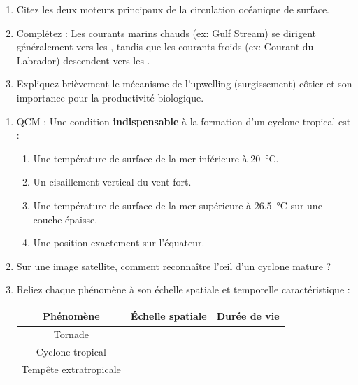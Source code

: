 \documentclass[11pt]{article}
\begin{document}
\begin{exercice}
\begin{enumerate}
    \item Citez les deux moteurs principaux de la circulation océanique de surface.
    \item Complétez : Les courants marins chauds (ex: Gulf Stream) se dirigent généralement vers les \underline{\hspace{3cm}}, tandis que les courants froids (ex: Courant du Labrador) descendent vers les \underline{\hspace{3cm}}.
    \item Expliquez brièvement le mécanisme de l'upwelling (surgissement) côtier et son importance pour la productivité biologique.
\end{enumerate}
\end{exercice}

\begin{exercice}
\begin{enumerate}
    \item QCM : Une condition \textbf{indispensable} à la formation d'un cyclone tropical est :
    \begin{enumerate}
        \item Une température de surface de la mer inférieure à \SI{20}{\celsius}.
        \item Un cisaillement vertical du vent fort.
        \item Une température de surface de la mer supérieure à \SI{26,5}{\celsius} sur une couche épaisse.
        \item Une position exactement sur l'équateur.
    \end{enumerate}
    \item Sur une image satellite, comment reconnaître l'œil d'un cyclone mature ?
    \item Reliez chaque phénomène à son échelle spatiale et temporelle caractéristique :
    \begin{tabular}{|c|c|c|}
    \hline
    \textbf{Phénomène} & \textbf{Échelle spatiale} & \textbf{Durée de vie} \\
    \hline
    Tornade &  &  \\
    \hline
    Cyclone tropical &  &  \\
    \hline
    Tempête extratropicale &  &  \\
    \hline
    \end{tabular}
\end{enumerate}
\end{exercice}
\end{document}
